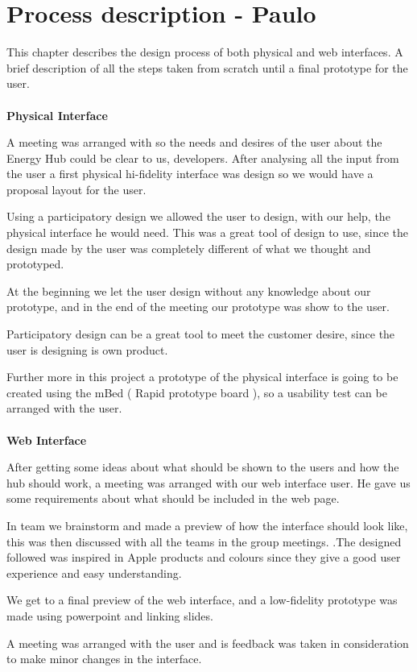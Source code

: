 \chapter{Process description - Paulo}

This chapter describes the design process of both physical and web interfaces. A brief description of all the steps taken from scratch until a final prototype for the user.
\\
\\\textbf{Physical Interface}

A meeting was arranged with so the needs and desires of the user about the Energy Hub could be clear to us, developers. After analysing all the input from the user a first physical hi-fidelity interface was design so we would have a proposal layout for the user. 

Using a participatory design we allowed the user to design, with our help, the physical interface he would need. This was a great tool of design to use, since the design made by the user was completely different of what we thought and prototyped. 

At the beginning we let the user design without any knowledge about our prototype, and in the end of the meeting our prototype was show to the user.

Participatory design can be a great tool to meet the customer desire, since the user is designing is own product.

Further more in this project a prototype of the physical interface is going to be created using the mBed ( Rapid prototype board ), so a usability test can be arranged with the user.
\\
\\\textbf{Web Interface} 

After getting some ideas about what should be shown to the users and how the hub should work, a meeting was arranged with our web interface user. He gave us some requirements about what should be included in the web page.

In team we brainstorm and made a preview of how the interface should look like, this was then discussed with all the teams in the group meetings. .The designed followed was inspired in Apple products and colours since they give a good user experience and easy understanding.

We get to a final preview of the web interface, and a low-fidelity prototype was made using powerpoint and linking slides. 

A meeting was arranged with the user and is feedback was taken in consideration to make minor changes in the interface.

